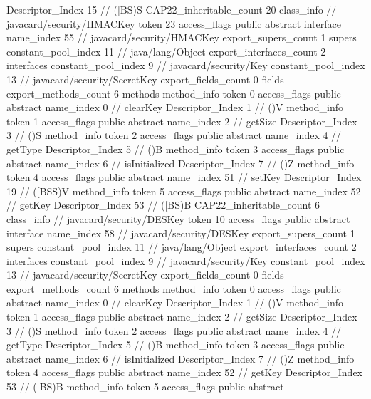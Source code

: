 {{{{{					Descriptor_Index	15		// ([BS)S
				}
			}
			CAP22_inheritable_count	20
		}
		class_info {		// javacard/security/HMACKey
			token	23
			access_flags	public abstract interface
			name_index	55		// javacard/security/HMACKey
			export_supers_count	1
			supers {
				constant_pool_index	11		// java/lang/Object
			}
			export_interfaces_count	2
			interfaces {
				constant_pool_index	9		// javacard/security/Key
				constant_pool_index	13		// javacard/security/SecretKey
			}
			export_fields_count	0
			fields {
			}
			export_methods_count	6
			methods {
				method_info {
					token	0
					access_flags	public abstract
					name_index	0		// clearKey
					Descriptor_Index	1		// ()V
				}
				method_info {
					token	1
					access_flags	public abstract
					name_index	2		// getSize
					Descriptor_Index	3		// ()S
				}
				method_info {
					token	2
					access_flags	public abstract
					name_index	4		// getType
					Descriptor_Index	5		// ()B
				}
				method_info {
					token	3
					access_flags	public abstract
					name_index	6		// isInitialized
					Descriptor_Index	7		// ()Z
				}
				method_info {
					token	4
					access_flags	public abstract
					name_index	51		// setKey
					Descriptor_Index	19		// ([BSS)V
				}
				method_info {
					token	5
					access_flags	public abstract
					name_index	52		// getKey
					Descriptor_Index	53		// ([BS)B
				}
			}
			CAP22_inheritable_count	6
		}
		class_info {		// javacard/security/DESKey
			token	10
			access_flags	public abstract interface
			name_index	58		// javacard/security/DESKey
			export_supers_count	1
			supers {
				constant_pool_index	11		// java/lang/Object
			}
			export_interfaces_count	2
			interfaces {
				constant_pool_index	9		// javacard/security/Key
				constant_pool_index	13		// javacard/security/SecretKey
			}
			export_fields_count	0
			fields {
			}
			export_methods_count	6
			methods {
				method_info {
					token	0
					access_flags	public abstract
					name_index	0		// clearKey
					Descriptor_Index	1		// ()V
				}
				method_info {
					token	1
					access_flags	public abstract
					name_index	2		// getSize
					Descriptor_Index	3		// ()S
				}
				method_info {
					token	2
					access_flags	public abstract
					name_index	4		// getType
					Descriptor_Index	5		// ()B
				}
				method_info {
					token	3
					access_flags	public abstract
					name_index	6		// isInitialized
					Descriptor_Index	7		// ()Z
				}
				method_info {
					token	4
					access_flags	public abstract
					name_index	52		// getKey
					Descriptor_Index	53		// ([BS)B
				}
				method_info {
					token	5
					access_flags	public abstract
}}}}}
